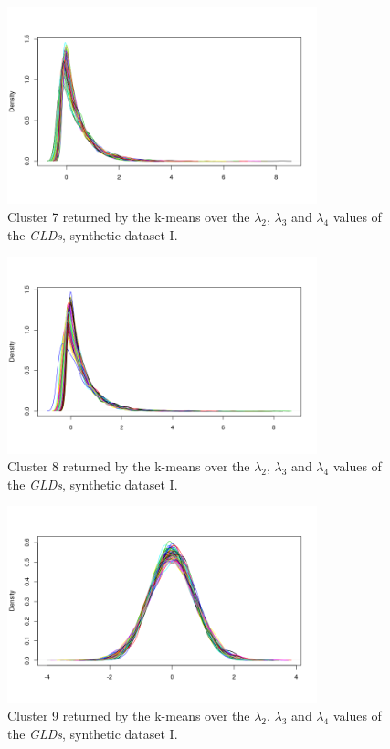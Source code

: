 \begin{figure}[H]
    \centering
    \includegraphics[width=0.8\textwidth]{img/gld_clustering/Dataset1/l2_l3_l4/intento_3/cluster7.png}
    \caption{Cluster 7 returned by the k-means over the $\lambda_{2}$, $\lambda_{3}$ and $\lambda_{4}$ values of the \textit{GLDs}, synthetic dataset I.}
    \label{fig:dataset1_l2l3l4_cl7}
\end{figure}

\begin{figure}[H]
    \centering
    \includegraphics[width=0.8\textwidth]{img/gld_clustering/Dataset1/l2_l3_l4/intento_3/cluster8.png}
    \caption{Cluster 8 returned by the k-means over the $\lambda_{2}$, $\lambda_{3}$ and $\lambda_{4}$ values of the \textit{GLDs}, synthetic dataset I.}
    \label{fig:dataset1_l2l3l4_cl8}
\end{figure}

\begin{figure}[H]
    \centering
    \includegraphics[width=0.8\textwidth]{img/gld_clustering/Dataset1/l2_l3_l4/intento_3/cluster9.png}
    \caption{Cluster 9 returned by the k-means over the $\lambda_{2}$, $\lambda_{3}$ and $\lambda_{4}$ values of the \textit{GLDs}, synthetic dataset I.}
    \label{fig:dataset1_l2l3l4_cl9}
\end{figure}

